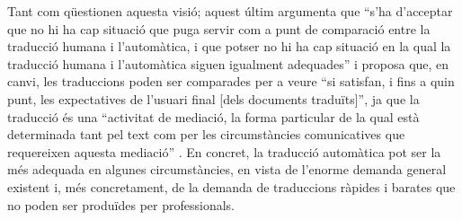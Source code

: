 Tant \citet{krauwer93j} com \citet{sager93b} qüestionen aquesta visió;
aquest últim argumenta que ``s'ha d'acceptar que no hi ha cap situació
que puga servir com a punt de comparació entre la traducció humana i
l'automàtica, i que potser no hi ha cap situació en la qual la
traducció humana i l'automàtica siguen igualment adequades'' \citep[p.~261]{sager93b} i proposa
que, en canvi, les traduccions poden ser comparades per a veure ``si
satisfan, i fins a quin punt, les expectatives de l'usuari final [dels
documents traduïts]'', ja que la traducció és una ``activitat de
mediació, la forma particular de la qual està determinada tant pel
text com per les circumstàncies comunicatives que requereixen aquesta
mediació'' \citep[p.~261]{sager93b}.  En concret, la
traducció automàtica pot ser la més adequada en algunes
circumstàncies, en vista de l'enorme demanda general existent i, més
concretament, de la demanda de traduccions ràpides i barates que no
poden ser produïdes per professionals.


